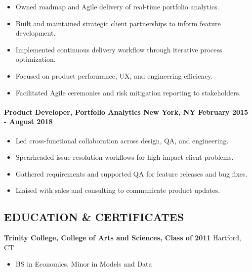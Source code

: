 \begin{itemize}
\tightlist
\item
  Owned roadmap and Agile delivery of real-time portfolio analytics.
\item
  Built and maintained strategic client partnerships to inform feature
  development.
\item
  Implemented continuous delivery workflow through iterative process
  optimization.
\item
  Focused on product performance, UX, and engineering efficiency.
\item
  Facilitated Agile ceremonies and risk mitigation reporting to
  stakeholders.
\end{itemize}

\paragraph{\texorpdfstring{\textbf{Product Developer, Portfolio
Analytics} \textbar{} New York, NY \textbar{} February 2015 - August
2018}{Product Developer, Portfolio Analytics \textbar{} New York, NY \textbar{} February 2015 - August 2018}}\label{product-developer-portfolio-analytics--new-york-ny--february-2015---august-2018}

\begin{itemize}
\tightlist
\item
  Led cross-functional collaboration across design, QA, and engineering.
\item
  Spearheaded issue resolution workflows for high-impact client
  problems.
\item
  Gathered requirements and supported QA for feature releases and bug
  fixes.
\item
  Liaised with sales and consulting to communicate product updates.
\end{itemize}

\subsection{EDUCATION \& CERTIFICATES}\label{education--certificates}

\textbf{Trinity College, College of Arts and Sciences, Class of 2011}
\textbar{} Hartford, CT

\begin{itemize}
\tightlist
\item
  BS in Economics, Minor in Models and Data
\end{itemize}

